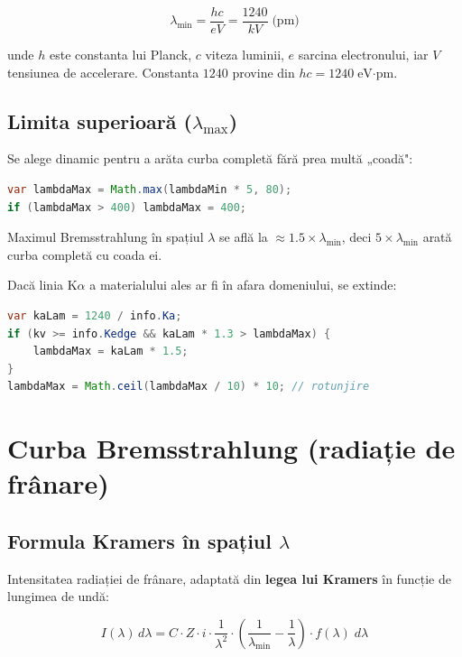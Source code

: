 \documentclass[12pt,a4paper]{article}
\begin{document}
\begin{equation}
    \boxed{\lambda_{\min} = \frac{hc}{eV} = \frac{1240}{kV} \;\text{(pm)}}
\end{equation}

unde $h$ este constanta lui Planck, $c$ viteza luminii, $e$ sarcina electronului, iar $V$ tensiunea de accelerare. Constanta $1240$ provine din $hc = 1240\;\text{eV·pm}$.

\subsection{Limita superioară ($\lambda_{\max}$)}

Se alege dinamic pentru a arăta curba completă fără prea multă „coadă":

\begin{lstlisting}[language=Java]
var lambdaMax = Math.max(lambdaMin * 5, 80);
if (lambdaMax > 400) lambdaMax = 400;
\end{lstlisting}

Maximul Bremsstrahlung în spațiul $\lambda$ se află la $\approx 1.5 \times \lambda_{\min}$, deci $5 \times \lambda_{\min}$ arată curba completă cu coada ei.

Dacă linia K$\alpha$ a materialului ales ar fi în afara domeniului, se extinde:

\begin{lstlisting}[language=Java]
var kaLam = 1240 / info.Ka;
if (kv >= info.Kedge && kaLam * 1.3 > lambdaMax) {
    lambdaMax = kaLam * 1.5;
}
lambdaMax = Math.ceil(lambdaMax / 10) * 10; // rotunjire
\end{lstlisting}


\section{Curba Bremsstrahlung (radiație de frânare)}

\subsection{Formula Kramers în spațiul $\lambda$}

Intensitatea radiației de frânare, adaptată din \textbf{legea lui Kramers} în funcție de lungimea de undă:

\begin{equation}
    \boxed{I(\lambda)\,d\lambda = C \cdot Z \cdot i \cdot \frac{1}{\lambda^2} \cdot \left(\frac{1}{\lambda_{\min}} - \frac{1}{\lambda}\right) \cdot f(\lambda)\;d\lambda}
\end{equation}
\end{document}

